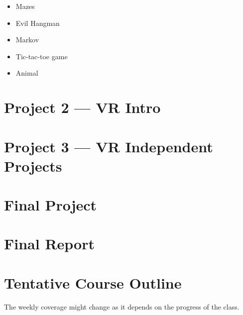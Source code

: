 \documentclass[11pt]{article}
\begin{document}
\begin{itemize}
    \itemsep-0.4em
    \item Mazes
    \item Evil Hangman
    \item Markov
    \item Tic-tac-toe game
    \item Animal
\end{itemize}

\section{Project 2 --- VR Intro}

\section{Project 3 --- VR Independent Projects}

\section{Final Project}

\section{Final Report}

\newpage

\section{Tentative Course Outline}


The weekly coverage might change as it depends on the progress of the class.
\end{document}
